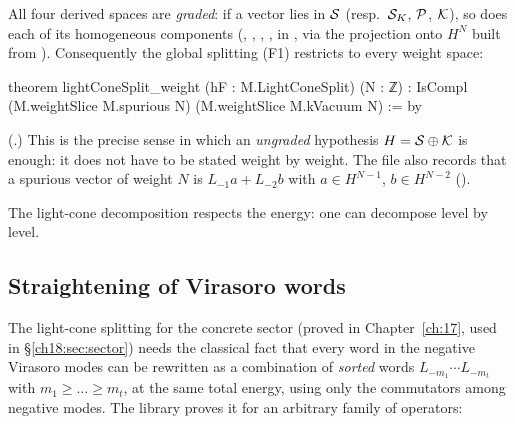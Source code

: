 All four derived spaces are \emph{graded}: if a vector lies in $\mathcal{S}$ (resp.\ $\mathcal{S}_K$, $\mathcal{P}$, $\mathcal{K}$), so does each of
its homogeneous components (, ,
, , in
, via the projection  onto
$H^N$ built from ).  Consequently the global splitting (F1) restricts to every
weight space:
\begin{leancode}
theorem lightConeSplit_weight (hF : M.LightConeSplit) (N : ℤ) :
    IsCompl (M.weightSlice M.spurious N) (M.weightSlice M.kVacuum N) := by
\end{leancode}
(.)  This is the precise sense in which an
\emph{ungraded} hypothesis $H=\mathcal{S}\oplus\mathcal{K}$ is enough: it does not have to be stated weight by weight.  The
file also records that a spurious vector of weight $N$ is $L_{-1}a+L_{-2}b$ with $a\in H^{N-1}$,
$b\in H^{N-2}$ ().
\begin{physics}
The light-cone decomposition respects the energy: one can decompose level by level.
\end{physics}

\subsection{Straightening of Virasoro words}

The light-cone splitting for the concrete sector (proved in Chapter~\ref{ch:17}, used in
\S\ref{ch18:sec:sector}) needs the classical fact that every word in the negative Virasoro modes can be
rewritten as a combination of \emph{sorted} words $L_{-m_1}\cdots L_{-m_t}$ with $m_1\ge\dots\ge m_t$, at
the same total energy, using only the commutators among negative modes.  The library proves it for an
arbitrary family of operators:

